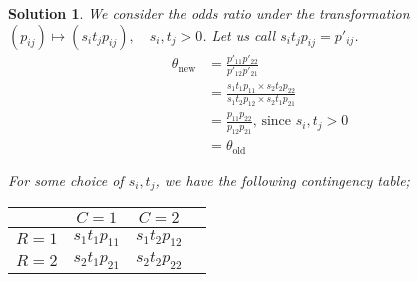 \documentclass[12pt]{article}
\theoremstyle{problemstyle}
\newtheorem{solution}{Solution}
\begin{document}
\begin{solution}
 	We consider the odds ratio under the transformation $(p_{ij}) \mapsto (s_i t_j p_{ij}), \quad s_i, t_j > 0$. Let us call $s_i t_j p_{ij} = p'_{ij}$. 
 	\begin{align*}
 		\theta_{\text{new}} & = \frac{p'_{11}p'_{22}}{p'_{12}p'_{21}}\\
 		& = \frac{s_1t_1p_{11}\times s_2t_2p_{22}}{s_1t_2p_{12}\times s_2t_1p_{21}}\\
 		& = \frac{p_{11}p_{22}}{p_{12}p_{21}} \text{, since } s_i, t_j > 0\\
 		& = \theta_{\text{old}}
 	\end{align*}
 	
 	For some choice of $s_i, t_j$, we have the following contingency table;
 	\begin{table}[H]
 		\centering 
 		\begin{tabular}{cccc}
 			\toprule
 			 & $C=1$ & $C=2$\\
 			\midrule 
 			$R=1$ & $s_1t_1p_{11}$ & $s_1t_2p_{12}$\\
 			$R=2$ & $s_2t_1p_{21}$ & $s_2t_2p_{22}$\\
 			\bottomrule
 		\end{tabular}	
 	\end{table}
 	

\end{solution}
\end{document}
